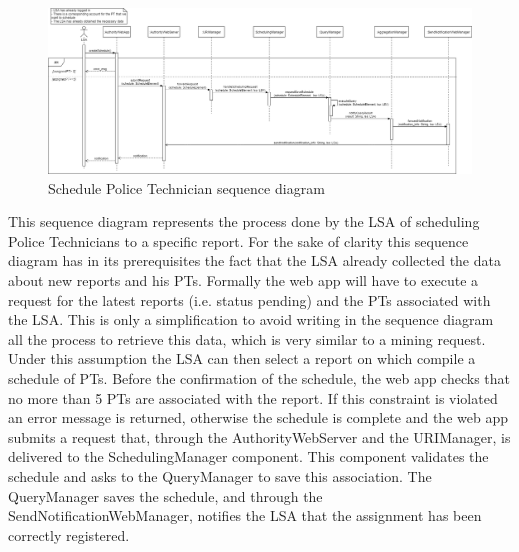 \begin{figure}[H]
  \centering
  \includegraphics[width=1\textwidth]{Images/UML_diagrams/Sequence_Diagrams/Schedule_PT_sd.png}
  \caption{Schedule Police Technician sequence diagram}
  \label{fig:schedule_PT_sd}
\end{figure}
This sequence diagram represents the process done by the LSA of scheduling Police Technicians to a specific report. For the sake of clarity this sequence diagram has in its prerequisites the fact that the LSA already collected the data about new reports and his PTs. Formally the web app will have to execute a request for the latest reports (i.e. status pending) and the PTs associated with the LSA. This is only a simplification to avoid writing in the sequence diagram all the process to retrieve this data, which is very similar to a mining request. Under this assumption the LSA can then select a report on which compile a schedule of PTs. Before the confirmation of the schedule, the web app checks that no more than 5 PTs are associated with the report. If this constraint is violated an error message is returned, otherwise the schedule is complete and the web app submits a request that, through the AuthorityWebServer and the URIManager, is delivered to the SchedulingManager component. This component validates the schedule and asks to the QueryManager to save this association. The QueryManager saves the schedule, and through the SendNotificationWebManager, notifies the LSA that the assignment has been correctly registered.
